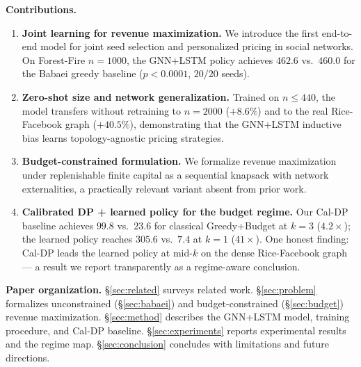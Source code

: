\smallskip
\noindent\textbf{Contributions.}
\begin{enumerate}[label=\textbf{C\arabic*.}, leftmargin=*, topsep=2pt,
                  itemsep=1pt, parsep=0pt]

  \item \textbf{Joint learning for revenue maximization.}
    We introduce the first end-to-end model for joint seed selection and
    personalized pricing in social networks.
    On Forest-Fire $n{=}1000$, the GNN+LSTM policy achieves
    $462.6$ %
    vs.\ $460.0$ for the Babaei greedy baseline
    ($p{<}0.0001$, $20/20$ seeds). %

  \item \textbf{Zero-shot size and network generalization.}
    Trained on $n \le 440$, the model transfers without retraining to
    $n{=}2000$ ($+8.6\%$) %
    and to the real Rice-Facebook graph ($+40.5\%$), %
    demonstrating that the GNN+LSTM inductive bias learns
    topology-agnostic pricing strategies.

  \item \textbf{Budget-constrained formulation.}
    We formalize revenue maximization under replenishable finite capital as a
    sequential knapsack with network externalities, a practically
    relevant variant absent from prior work.

  \item \textbf{Calibrated DP + learned policy for the budget regime.}
    Our Cal-DP baseline achieves $99.8$ vs.\ $23.6$ for classical Greedy+Budget
    at $k{=}3$ ($4.2{\times}$); %
    the learned policy reaches $305.6$ vs.\ $7.4$ at $k{=}1$ ($41{\times}$). %
    One honest finding: Cal-DP leads the learned policy at mid-$k$ on the
    dense Rice-Facebook graph — a result we report transparently as a
    regime-aware conclusion.

\end{enumerate}

\smallskip
\noindent\textbf{Paper organization.}
\S\ref{sec:related} surveys related work.
\S\ref{sec:problem} formalizes unconstrained (\S\ref{sec:babaei}) and
budget-constrained (\S\ref{sec:budget}) revenue maximization.
\S\ref{sec:method} describes the GNN+LSTM model, training procedure, and
Cal-DP baseline.
\S\ref{sec:experiments} reports experimental results and the regime map.
\S\ref{sec:conclusion} concludes with limitations and future directions.
